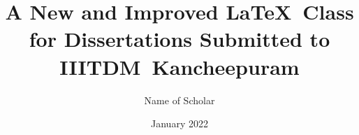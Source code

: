
\title{A New and Improved \LaTeX\ Class for Dissertations Submitted to IIITDM~Kancheepuram}

\author{Name of Scholar}

\date{January 2022}


\maketitle
\restoregeometry

\clearpage \mbox{} \thispagestyle{empty} \clearpage